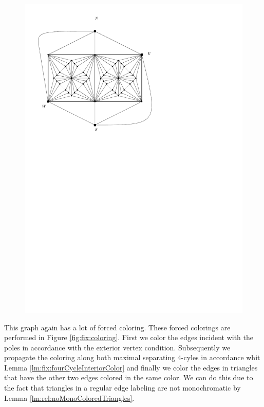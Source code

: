   \begin{figure}[h]
    \centering
    \includegraphics[scale=1]{fixExtension/img/manymanybase}
    \caption{}
    \label{fig:fix:manymany0}
  \end{figure}

  This graph again has a lot of forced coloring. These forced colorings are performed in Figure \ref{fig:fix:coloring}. First we color the edges incident with the poles in accordance with the exterior vertex condition. Subsequently we propagate the coloring along both maximal separating $4$-cyles in accordance whit Lemma \ref{lm:fix:fourCycleInteriorColor} and finally we color the edges in triangles that have the other two edges colored in the same color. We can do this due to the fact that triangles in a regular edge labeling are not monochromatic by Lemma \ref{lm:rel:noMonoColoredTriangles}.


